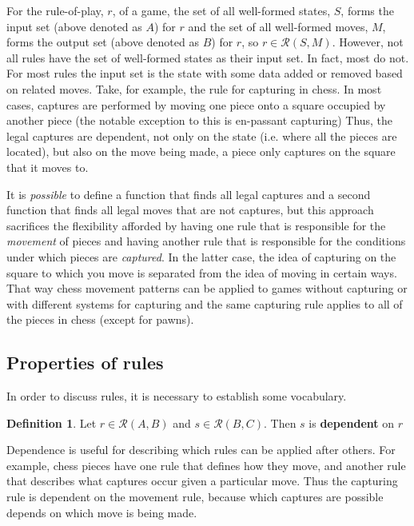 \documentclass{article}
\theoremstyle{definition}
\newtheorem{definition}{Definition}[subsection]
\theoremstyle{plain}
\def\rule{\mathcal{R}}
\begin{document}
For the rule-of-play, $ r $, of a game,
the set of all well-formed states, $ S $, forms the input set (above denoted as $ A $) for $ r $
and the set of all well-formed moves, $ M $, forms the output set (above denoted as $ B $) for $ r $,
so $ r \in \rule (S, M) $.
However, not all rules have the set of well-formed states as their input set.
In fact, most do not.
For most rules the input set is the state with some data added or removed based on related moves.
Take, for example, the rule for capturing in chess.
In most cases, captures are performed by moving one piece onto a square occupied by another piece
(the notable exception to this is en-passant capturing)
Thus, the legal captures are dependent, not only on the state (i.e. where all the pieces are located),
but also on the move being made, a piece only captures on the square that it moves to.

It is \emph{possible} to define a function that finds all legal captures
and a second function that finds all legal moves that are not captures,
but this approach sacrifices the flexibility afforded by having
one rule that is responsible for the \emph{movement} of pieces
and having another rule that is responsible for the conditions under which pieces are \emph{captured}.
In the latter case, the idea of capturing on the square to which you move is separated from the idea of moving in certain ways.
That way chess movement patterns can be applied to games without capturing or with different systems for capturing
and the same capturing rule applies to all of the pieces in chess (except for pawns).

\subsection{Properties of rules} %

In order to discuss rules,
it is necessary to establish some vocabulary.

\begin{definition}
  Let $ r \in \rule (A, B) $ and $ s \in \rule (B, C) $.
  Then $ s $ is \textbf{dependent} on $ r $
\end{definition}

Dependence is useful for describing which rules can be applied after others.
For example, chess pieces have one rule that defines how they move,
and another rule that describes what captures occur given a particular move.
Thus the capturing rule is dependent on the movement rule,
because which captures are possible depends on which move is being made.
\end{document}
